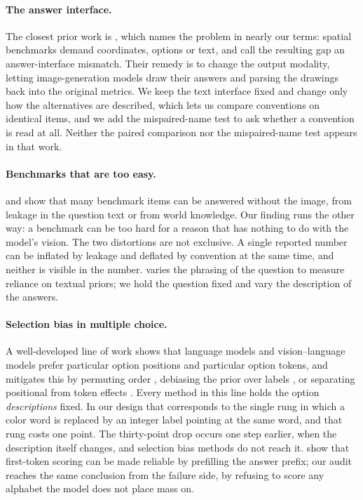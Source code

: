 \documentclass{article}
\begin{document}
\paragraph{The answer interface.} The closest prior work is
\citet{provise2026}, which names the problem in nearly our terms: spatial
benchmarks demand coordinates, options or text, and call the resulting gap an
answer-interface mismatch. Their remedy is to change the output modality, letting
image-generation models draw their answers and parsing the drawings back into the
original metrics. We keep the text interface fixed and change only how the
alternatives are described, which lets us compare conventions on identical items,
and we add the mispaired-name test to ask whether a convention is read at all.
Neither the paired comparison nor the mispaired-name test appears in that work.

\paragraph{Benchmarks that are too easy.} \citet{seeingwithoutlooking2026} and
\citet{mmgist2026} show that many benchmark items can be answered without the
image, from leakage in the question text or from world knowledge. Our finding runs
the other way: a benchmark can be too hard for a reason that has nothing to do
with the model's vision. The two distortions are not exclusive. A single reported
number can be inflated by leakage and deflated by convention at the same time, and
neither is visible in the number. \citet{seeorguess2026} varies the phrasing of
the question to measure reliance on textual priors; we hold the question fixed and
vary the description of the answers.

\paragraph{Selection bias in multiple choice.} A well-developed line of work
shows that language models and vision--language models prefer particular option
positions and particular option tokens, and mitigates this by permuting order
\citep{mmbench2024}, debiasing the prior over labels \citep{pride2024}, or
separating positional from token effects \citep{lvlmselectionbias2025}. Every
method in this line holds the option \emph{descriptions} fixed. In our design that
corresponds to the single rung in which a color word is replaced by an integer
label pointing at the same word, and that rung costs one point. The thirty-point
drop occurs one step earlier, when the description itself changes, and selection
bias methods do not reach it. \citet{prefill2025} show that first-token scoring
can be made reliable by prefilling the answer prefix; our audit reaches the same
conclusion from the failure side, by refusing to score any alphabet the model does
not place mass on.
\end{document}
